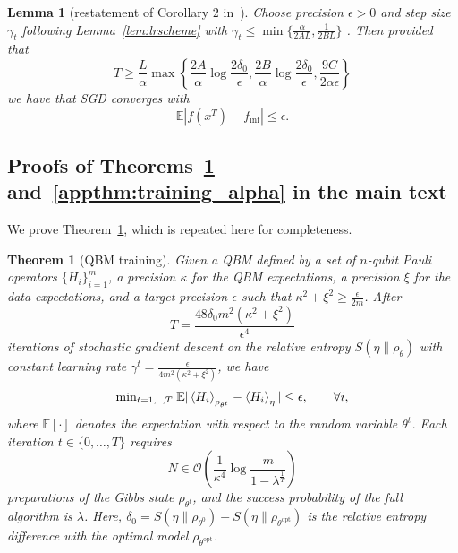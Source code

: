 \documentclass[
    reprint,
    aps,
    prx,
    longbibliography
]{revtex4-2}
\newtheorem{theorem}{Theorem}
\newtheorem{lemma}{Lemma}
\begin{document}
\begin{lemma}[restatement of Corollary $2$ in~\cite{Khaled2020}]
\label{lem:sgd_conv_2}
Choose precision $\epsilon > 0$ and step size $\gamma_t$ following Lemma~\ref{lem:lrscheme} with $\gamma_t\leq \min \{\frac{\alpha}{2AL}, \frac{1}{2BL}\}$ . Then provided that 
\begin{equation}
\label{eq:condition_1}
T \geq \frac{L}{\alpha} \max \left\{ \frac{2A}{\alpha}\log{\frac{2\delta_0}{\epsilon}}, \frac{2B}{\alpha}\log{\frac{2\delta_0}{\epsilon}}, \frac{9C}{2\alpha \epsilon} \right\}
\end{equation} 
we have that SGD converges with 
\begin{equation}
 \mathbb{E} |f(x^T)-f_{\mathrm{inf}} | \leq \epsilon .
\end{equation}
\end{lemma}


\subsection*{Proofs of Theorems~\ref{appthm:training} and~\ref{appthm:training_alpha} in the main text}

We prove Theorem~\ref{appthm:training}, which is repeated here for completeness. 

\begingroup
\def\thetheorem{1}
\begin{theorem}[QBM training]\label{appthm:training}
Given a QBM defined by a set of $n$-qubit Pauli operators $\{H_i\}_{i=1}^m$, a precision $\kappa$ for the QBM expectations, a precision $\xi$ for the data expectations, and a target precision $\epsilon$ such that $\kappa^2 + \xi^2 \geq \frac{\epsilon}{2m}$. After 
\begin{equation}
    T = \frac{48\delta_0 m^2  (\kappa^2 + \xi^2 )}{\epsilon^4}
\end{equation} 
iterations of stochastic gradient descent on the relative entropy $S(\eta \|\rho_\theta)$ with constant learning rate $\gamma^t=\frac{\epsilon}{4m^2(\kappa^2+\xi^2)}$, we have
\begin{equation}
    \mathrm{min}_{t=1,..,T} \; \mathbb{E}| \expval{H_i}_{\rho_{\theta^t}}  - \expval{H_i}_\eta | \leq \epsilon, \qquad \forall i,
\end{equation} where $\mathbb{E}[\cdot]$ denotes the expectation with respect to the random variable $\theta^t$. 
Each iteration $t \in \{0, \dots, T\}$ requires
\begin{equation}
\label{eq:copies_app}
    N \in \mathcal{O} \left( \frac{1}{{\kappa^4}} \log \frac{ m} { 1-\lambda^{\frac{1}{T}} } \right)
\end{equation}
preparations of the Gibbs state $\rho_{\theta^t}$, and the success probability of the full algorithm is $\lambda$. Here, $\delta_0 = S(\eta\|\rho_{\theta^0})-S(\eta\|\rho_{\theta^\mathrm{opt}})$ is the relative entropy difference with the optimal model $\rho_{\theta^\mathrm{opt}}$.
\end{theorem}
\endgroup
\end{document}
